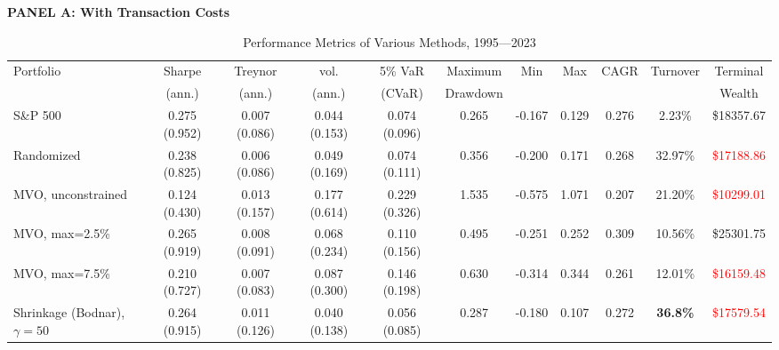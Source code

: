 \documentclass[12pt,letterpaper]{article}
\begin{document}
\clearpage %
\begin{landscape}
\begin{table}[ht]
\renewcommand{\arraystretch}{1.5}
\centering
\caption{Performance Metrics of Various Methods, 1995---2023}
\label{tab:performance_metrics_table}
{\footnotesize

\textbf{PANEL A: With Transaction Costs} \\

\begin{tabular}{lcccccccccc}
\toprule
Portfolio  & Sharpe & Treynor & vol. & 5\% VaR & Maximum & Min & Max & CAGR & Turnover & Terminal \\
        & (ann.) & (ann.) & (ann.) & (CVaR) & Drawdown & & & & & Wealth \\
\midrule

S\&P 500 
& 0.275 (0.952) 
& 0.007 (0.086) 
& 0.044 (0.153)
& 0.074 (0.096) 
& 0.265 
& -0.167 
& 0.129 
& 0.276 
& 2.23\%
& \$18357.67 \\

Randomized
& 0.238 (0.825) 
& 0.006 (0.086) 
& 0.049 (0.169) 
& 0.074 (0.111) 
& 0.356
& -0.200
& 0.171
& 0.268
& 32.97\%
    & \textcolor{red}{\$17188.86} \\

MVO, unconstrained
& 0.124 (0.430) 
& 0.013 (0.157) 
& 0.177 (0.614)
& 0.229 (0.326) 
& 1.535 
& -0.575
& 1.071
& 0.207 
& 21.20\%
& \textcolor{red}{\$10299.01} \\

MVO, max=2.5\%
& 0.265 (0.919) 
& 0.008 (0.091) 
& 0.068 (0.234)
& 0.110 (0.156) 
& 0.495
& -0.251
& 0.252 
& 0.309
& 10.56\%
& \textcolor{mygreen}{\$25301.75} \\

MVO, max=7.5\%
& 0.210 (0.727) 
& 0.007 (0.083) 
& 0.087 (0.300)
& 0.146 (0.198) 
& 0.630 
& -0.314
& 0.344
& 0.261 
& 12.01\%
& \textcolor{red}{\$16159.48} \\


Shrinkage (Bodnar), $\gamma=50$
& 0.264 (0.915) 
& 0.011 (0.126) 
& 0.040 (0.138)
& 0.056 (0.085) 
& 0.287 
& -0.180
& 0.107 
& 0.272 
& \textbf{36.8\%}
& \textcolor{red}{\$17579.54} \\


\end{tabular}}
\end{table}
\end{landscape}
\end{document}
